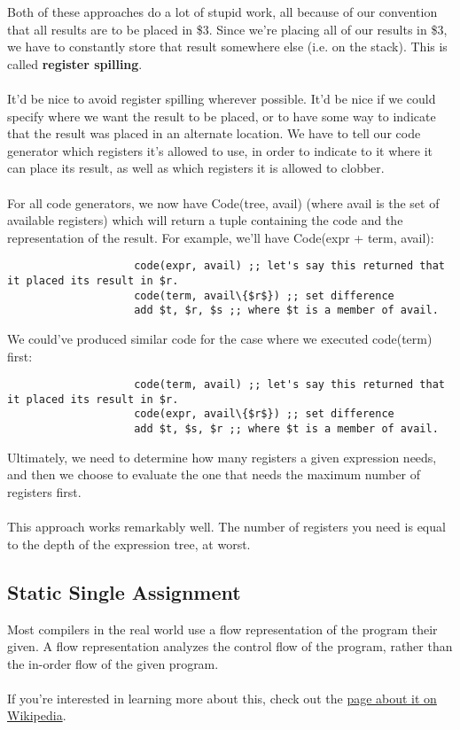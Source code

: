 \documentclass[]{article}
\theoremstyle{definition}
\begin{document}
				Both of these approaches do a lot of stupid work, all because of our convention that all results are to be placed in \$3. Since we're placing all of our results in \$3, we have to constantly store that result somewhere else (i.e. on the stack). This is called \textbf{register spilling}.
				\\ \\
				It'd be nice to avoid register spilling wherever possible. It'd be nice if we could specify where we want the result to be placed, or to have some way to indicate that the result was placed in an alternate location. We have to tell our code generator which registers it's allowed to use, in order to indicate to it where it can place its result, as well as which registers it is allowed to clobber.
				\\ \\
				For all code generators, we now have Code(tree, avail) (where avail is the set of available registers) which will return a tuple containing the code and the representation of the result. For example, we'll have Code(expr + term, avail):
				\begin{verbatim}
					code(expr, avail) ;; let's say this returned that it placed its result in $r.
					code(term, avail\{$r$}) ;; set difference
					add $t, $r, $s ;; where $t is a member of avail.
				\end{verbatim}
				
				We could've produced similar code for the case where we executed code(term) first:
				\begin{verbatim}
					code(term, avail) ;; let's say this returned that it placed its result in $r.
					code(expr, avail\{$r$}) ;; set difference
					add $t, $s, $r ;; where $t is a member of avail.
				\end{verbatim}
			
				Ultimately, we need to determine how many registers a given expression needs, and then we choose to evaluate the one that needs the maximum number of registers first.
				\\ \\
				This approach works remarkably well. The number of registers you need is equal to the depth of the expression tree, at worst.
		\subsection{Static Single Assignment}
			Most compilers in the real world use a flow representation of the program their given. A flow representation analyzes the control flow of the program, rather than the in-order flow of the given program.
			\\ \\
			If you're interested in learning more about this, check out the \href{http://en.wikipedia.org/wiki/Static_single_assignment_form}{page about it on Wikipedia}.
	
\end{document}
